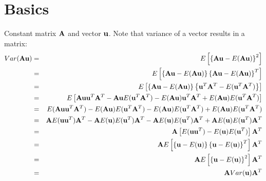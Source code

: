 \documentclass[11pt]{article}
\theoremstyle{remark}
\begin{document}
\section{Basics}
Constant matrix $\bold{A}$ and vector $\bold{u}$. Note that variance of a vector results in a matrix:
\begin{eqnarray}
Var(\bold{A}\bold{u}) &=& E\left[ \left\{  \bold{A}\bold{u}-E(\bold{A}\bold{u})  \right\}^2 \right]\nonumber\\
&=& E\left[ \left\{  \bold{A}\bold{u}-E(\bold{A}\bold{u})  \right\} \left\{ \bold{A}\bold{u}-E(\bold{A}\bold{u})  \right\}^T \right]\nonumber\\
&=& E\left[ \left\{  \bold{A}\bold{u}-E(\bold{A}\bold{u})  \right\} \left\{  \bold{u}^T\bold{A}^T-E(\bold{u}^T\bold{A}^T)  \right\} \right]\nonumber\\
&=& E\left[ \bold{A}\bold{u} \bold{u}^T\bold{A}^T - \bold{A}\bold{u} E(\bold{u}^T\bold{A}^T) -E(\bold{A}\bold{u})\bold{u}^T\bold{A}^T + E(\bold{A}\bold{u}) E(\bold{u}^T\bold{A}^T) \right]\nonumber\\
&=& E(\bold{A}\bold{u} \bold{u}^T\bold{A}^T) - E(\bold{A}\bold{u}) E(\bold{u}^T\bold{A}^T) -E(\bold{A}\bold{u})E(\bold{u}^T\bold{A}^T) + E(\bold{A}\bold{u}) E(\bold{u}^T\bold{A}^T)\nonumber\\
&=& \bold{A}E(\bold{u} \bold{u}^T)\bold{A}^T - \bold{A}E(\bold{u}) E(\bold{u}^T)\bold{A}^T - \bold{A}E(\bold{u})E(\bold{u}^T)\bold{A}^T + \bold{A}E(\bold{u}) E(\bold{u}^T)\bold{A}^T\nonumber\\
&=& \bold{A} \left[ E(\bold{u} \bold{u}^T) - E(\bold{u}) E(\bold{u}^T) \right]\bold{A}^T \nonumber\\
&=& \bold{A} E\left[ \left\{ \bold{u} - E(\bold{u}) \right\} \left\{ \bold{u} - E(\bold{u}) \right\}^T \right]\bold{A}^T \nonumber\\
&=& \bold{A} E\left[ \left\{ \bold{u} - E(\bold{u}) \right\}^2 \right]\bold{A}^T \nonumber\\
&=& \bold{A} Var(\bold{u}) \bold{A}^T 
\label{VarianceProdConstantMatrix}
\end{eqnarray}

\clearpage
\end{document}
